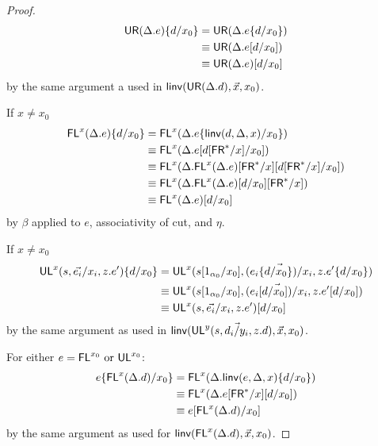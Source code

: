 \begin{proof}
\begin{align*}
\mathsf{UR}(\Delta.e)\{d/x_0\} 
&= \mathsf{UR}(\Delta.e\{d/x_0\})\\
&\equiv \mathsf{UR}(\Delta.e[d/x_0])\\
&\equiv \mathsf{UR}(\Delta.e)[d/x_0] 
\end{align*}
by the same argument a used in $\mathsf{linv}(\mathsf{UR}(\Delta.d),\vec{x},x_0)$.

If $x \neq x_0$
\begin{align*}
\mathsf{FL}^{x}(\Delta.e)\{d/x_0\} 
&= \mathsf{FL}^{x}(\Delta.e\{\mathsf{linv}(d,\Delta,x)/x_0\}) \\
&\equiv \mathsf{FL}^{x}(\Delta.e[d[\mathsf{FR}^*/x]/x_0]) \\
&\equiv \mathsf{FL}^{x}(\Delta.\mathsf{FL}^{x}(\Delta.e)[\mathsf{FR}^*/x][d[\mathsf{FR}^*/x]/x_0]) \\
&\equiv \mathsf{FL}^{x}(\Delta.\mathsf{FL}^{x}(\Delta.e)[d/x_0][\mathsf{FR}^*/x]) \\
&\equiv \mathsf{FL}^{x}(\Delta.e)[d/x_0] 
\end{align*}
by $\beta$ applied to $e$, associativity of cut, and $\eta$.

If $x \neq x_0$
\begin{align*}
\mathsf{UL}^{x}_{}(s,\vec{e_i}/x_i,z.e')\{d/x_0\} 
&= {\mathsf{UL}^{x}_{}(s[1_{\alpha_0}/x_0],\vec{(e_i\{d/x_0\})/x_i},z.e'\{d/x_0\})} \\
&\equiv {\ensuremath{\mathsf{UL}^{x}_{}(s[1_{\alpha_0}/x_0],\vec{(e_i[d/x_0])/x_i},z.e'[d/x_0])}} \\
&\equiv \mathsf{UL}^{x}_{}(s,\vec{e_i}/x_i,z.e')[d/x_0] 
\end{align*}
by the same argument as used in $\mathsf{linv}(\mathsf{UL}^{y}_{}(s,\vec{d_i/y_i},z.d),\vec{x},x_0)$.

For either $e = \mathsf{FL}^{x_0} \text{ or } \mathsf{UL}^{x_0}$:
\begin{align*}
e\{\mathsf{FL}^{x}(\Delta.d)/x_0\} 
&= \mathsf{FL}^{x}(\Delta.\mathsf{linv}(e,\Delta,x)\{d/x_0\}) \\
&\equiv \mathsf{FL}^{x}(\Delta.e[\mathsf{FR}^*/x][d/x_0]) \\
&\equiv e[\mathsf{FL}^{x}(\Delta.d)/x_0] 
\end{align*}
by the same argument as used for $\mathsf{linv}(\mathsf{FL}^{x}(\Delta.d),\vec{x},x_0)$.


\end{proof}
